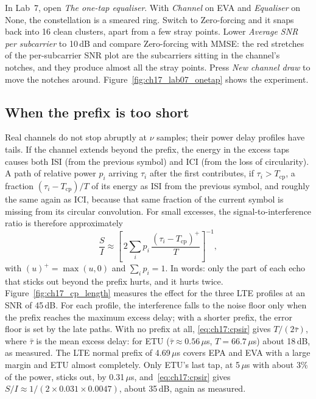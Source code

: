 
\begin{tryit}
In Lab~7, open \emph{The one-tap equaliser}. With \emph{Channel} on EVA and \emph{Equaliser} on
None, the constellation is a smeared ring. Switch to Zero-forcing and it snaps back into 16 clean
clusters, apart from a few stray points. Lower \emph{Average SNR per subcarrier} to 10\,dB and
compare Zero-forcing with MMSE: the red stretches of the per-subcarrier SNR plot are the
subcarriers sitting in the channel's notches, and they produce almost all the stray points. Press
\emph{New channel draw} to move the notches around. Figure~\ref{fig:ch17_lab07_onetap} shows the experiment.
\end{tryit}

\subsection{When the prefix is too short}

Real channels do not stop abruptly at $\nu$ samples; their power delay profiles have tails. If the
channel extends beyond the prefix, the energy in the excess taps causes both ISI (from the previous
symbol) and ICI (from the loss of circularity). A path of relative power $p_i$ arriving $\tau_i$ after
the first contributes, if $\tau_i>T_{\text{cp}}$, a fraction $(\tau_i-T_{\text{cp}})/T$ of its
energy as ISI from the previous symbol, and roughly the same again as ICI, because that same fraction
of the current symbol is missing from its circular convolution. For small excesses, the
signal-to-interference ratio is therefore approximately
\begin{equation}
\frac{S}{I}\approx\left[\,2\sum_i p_i\,\frac{(\tau_i-T_{\text{cp}})^+}{T}\right]^{-1},
\label{eq:ch17:cpsir}
\end{equation}
with $(u)^+=\max(u,0)$ and $\sum_ip_i=1$. In words: only the part of each echo that sticks out
beyond the prefix hurts, and it hurts twice. Figure~\ref{fig:ch17_cp_length} measures the effect for the
three LTE profiles at an SNR of 45\,dB. For each profile, the interference falls to the noise floor
only when the prefix reaches the maximum excess delay; with a shorter prefix, the error floor is set
by the late paths. With no prefix at all, \eqref{eq:ch17:cpsir} gives $T/(2\bar\tau)$, where $\bar\tau$ is
the mean excess delay: for ETU ($\bar\tau\approx0.56\,\mu$s, $T=66.7\,\mu$s) about 18\,dB, as
measured. The LTE normal prefix of 4.69\,$\mu$s covers EPA and EVA with a large margin and ETU almost
completely. Only ETU's last tap, at 5\,$\mu$s with about 3\% of the power, sticks out, by 0.31\,$\mu$s,
and~\eqref{eq:ch17:cpsir} gives $S/I\approx1/(2\times0.031\times0.0047)$, about 35\,dB, again as measured.


